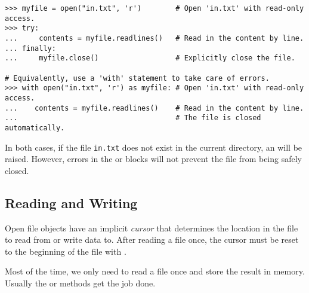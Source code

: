 \begin{lstlisting}
>>> myfile = open("in.txt", 'r')        # Open 'in.txt' with read-only access.
>>> try:
...     contents = myfile.readlines()   # Read in the content by line.
... finally:
...     myfile.close()                  # Explicitly close the file.

# Equivalently, use a 'with' statement to take care of errors.
>>> with open("in.txt", 'r') as myfile: # Open 'in.txt' with read-only access.
...    contents = myfile.readlines()    # Read in the content by line.
...                                     # The file is closed automatically.
\end{lstlisting}

In both cases, if the file \texttt{in.txt} does not exist in the current directory, an  will be raised.
However, errors in the  or  blocks will not prevent the file from being safely closed.

\subsection*{Reading and Writing} %

Open file objects have an implicit \emph{cursor} that determines the location in the file to read from or write data to.
After reading a file once, the cursor must be reset to the beginning of the file with .

Most of the time, we only need to read a file once and store the result in memory.
Usually the  or  methods get the job done.

